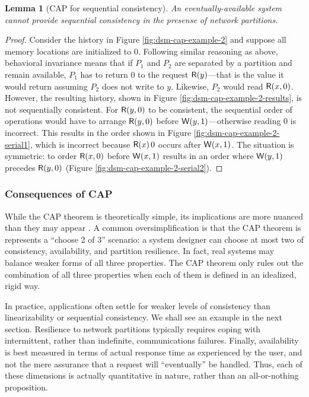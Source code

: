 \documentclass[]             %
{NASA}                       %
\newtheorem{lemma}[theorem]{Lemma}
\theoremstyle{definition}
\begin{document}
\begin{lemma}[CAP for sequential consistency]
  \label{thm:cap-sequential}
  An eventually-available system cannot provide sequential consistency
  in the presense of network partitions.
\end{lemma}
\begin{proof}
  Consider the history in Figure \ref{fig:dsm-cap-example-2} and
  suppose all memory locations are initialized to $0$. Following
  similar reasoning as above, behavioral invariance means that if
  $P_1$ and $P_2$ are separated by a partition and remain available,
  $P_1$ has to return $0$ to the request $\mathsf{R}\!\left(y\right)$---that is the
  value it would return assuming $P_2$ does not write to
  $y$. Likewise, $P_2$ would read $\mathsf{R}\!\left(x, 0\right)$. However, the
  resulting history, shown in Figure
  \ref{fig:dsm-cap-example-2-results}, is not sequentially
  consistent. For $\mathsf{R}\!\left(y, 0\right)$ to be consistent, the sequential
  order of operations would have to arrange $\mathsf{R}\!\left(y, 0\right)$ before
  $\mathsf{W}\!\left(y, 1\right)$---otherwise reading $0$ is incorrect. This results
  in the order shown in Figure \ref{fig:dsm-cap-example-2-serial1},
  which is incorrect because $\mathsf{R}\!\left(x\right){0}$ occurs after
  $\mathsf{W}\!\left(x, 1\right)$. The situation is symmetric: to order
  $\mathsf{R}\!\left(x, 0\right)$ before $\mathsf{W}\!\left(x, 1\right)$ results in an order where
  $\mathsf{W}\!\left(y, 1\right)$ precedes $\mathsf{R}\!\left(y, 0\right)$ (Figure \ref{fig:dsm-cap-example-2-serial2}).
\end{proof}

\subsubsection{Consequences of CAP}
\label{interpretation-of-the-cap-theorem}
While the CAP theorem is theoretically simple, its implications are
more nuanced than they may appear \cite{2012CAP12Years}. A common
oversimplification is that the CAP theorem is represents a ``choose 2
of 3'' scenario: a system designer can choose at most two of
consistency, availability, and partition resilience. In fact, real
systems may balance weaker forms of all three properties. The CAP
theorem only rules out the combination of all three properties when
each of them is defined in an idealized, rigid way.

In practice, applications often settle for weaker levels of
consistency than linearizability or sequential consistency. We shall
see an example in the next section. Resilience to network partitions
typically requires coping with intermittent, rather than indefinite,
communications failures. Finally, availability is best measured in
terms of actual response time as experienced by the user, and not the
mere assurance that a request will ``eventually'' be handled. Thus,
each of these dimensions is actually quantitative in nature, rather
than an all-or-nothing proposition.
\end{document}
